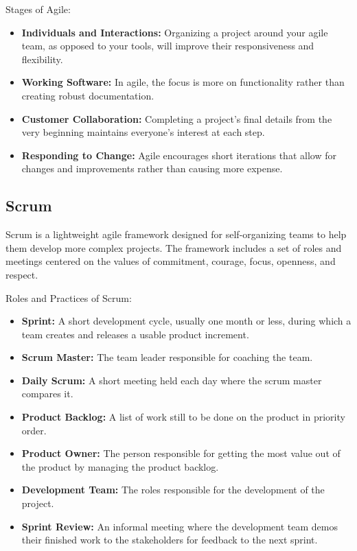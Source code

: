 \documentclass{article}
\begin{document}
Stages of Agile:
\begin{itemize}
    \item \textbf{Individuals and Interactions:} Organizing a project around your agile team, as opposed to your tools, will improve their responsiveness and flexibility.
    \item \textbf{Working Software:} In agile, the focus is more on functionality rather than creating robust documentation.
    \item \textbf{Customer Collaboration:} Completing a project's final details from the very beginning maintains everyone's interest at each step.
    \item \textbf{Responding to Change:} Agile encourages short iterations that allow for changes and improvements rather than causing more expense.
\end{itemize}

\subsection{Scrum}
Scrum is a lightweight agile framework designed for self-organizing teams to help them develop more complex projects. The framework includes a set of roles and meetings centered on the values of commitment, courage, focus, openness, and respect.

Roles and Practices of Scrum:
\begin{itemize}
    \item \textbf{Sprint:} A short development cycle, usually one month or less, during which a team creates and releases a usable product increment.
    \item \textbf{Scrum Master:} The team leader responsible for coaching the team.
    \item \textbf{Daily Scrum:} A short meeting held each day where the scrum master compares it.
    \item \textbf{Product Backlog:} A list of work still to be done on the product in priority order.
    \item \textbf{Product Owner:} The person responsible for getting the most value out of the product by managing the product backlog.
    \item \textbf{Development Team:} The roles responsible for the development of the project.
    \item \textbf{Sprint Review:} An informal meeting where the development team demos their finished work to the stakeholders for feedback to the next sprint.
\end{itemize}
\end{document}

